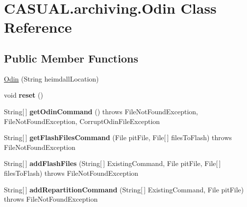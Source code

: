 \hypertarget{classCASUAL_1_1archiving_1_1Odin}{\section{C\-A\-S\-U\-A\-L.\-archiving.\-Odin Class Reference}
\label{classCASUAL_1_1archiving_1_1Odin}
}
\subsection*{Public Member Functions}
\begin{DoxyCompactItemize}
\item 
\hyperlink{classCASUAL_1_1archiving_1_1Odin_a0b866241e776314cf2f179795c4303c4}{Odin} (String heimdall\-Location)
\item 
\hypertarget{classCASUAL_1_1archiving_1_1Odin_a8d7f4bfb02dd6b023e9322270e89013c}{void {\bfseries reset} ()}\label{classCASUAL_1_1archiving_1_1Odin_a8d7f4bfb02dd6b023e9322270e89013c}

\item 
\hypertarget{classCASUAL_1_1archiving_1_1Odin_a0e92a86a4b6daf858e78f65d431bb226}{String\mbox{[}$\,$\mbox{]} {\bfseries get\-Odin\-Command} ()  throws File\-Not\-Found\-Exception, File\-Not\-Found\-Exception, Corrupt\-Odin\-File\-Exception }\label{classCASUAL_1_1archiving_1_1Odin_a0e92a86a4b6daf858e78f65d431bb226}

\item 
\hypertarget{classCASUAL_1_1archiving_1_1Odin_aef77b9a893f1faf7b57de25102621d03}{String\mbox{[}$\,$\mbox{]} {\bfseries get\-Flash\-Files\-Command} (File pit\-File, File\mbox{[}$\,$\mbox{]} files\-To\-Flash)  throws File\-Not\-Found\-Exception }\label{classCASUAL_1_1archiving_1_1Odin_aef77b9a893f1faf7b57de25102621d03}

\item 
\hypertarget{classCASUAL_1_1archiving_1_1Odin_ad628882606935f87692fe1fa10768a75}{String\mbox{[}$\,$\mbox{]} {\bfseries add\-Flash\-Files} (String\mbox{[}$\,$\mbox{]} Existing\-Command, File pit\-File, File\mbox{[}$\,$\mbox{]} files\-To\-Flash)  throws File\-Not\-Found\-Exception }\label{classCASUAL_1_1archiving_1_1Odin_ad628882606935f87692fe1fa10768a75}

\item 
\hypertarget{classCASUAL_1_1archiving_1_1Odin_ace41339836b3370f6d654a5d8752f658}{String\mbox{[}$\,$\mbox{]} {\bfseries add\-Repartition\-Command} (String\mbox{[}$\,$\mbox{]} Existing\-Command, File pit\-File)  throws File\-Not\-Found\-Exception }\label{classCASUAL_1_1archiving_1_1Odin_ace41339836b3370f6d654a5d8752f658}

\end{DoxyCompactItemize}
